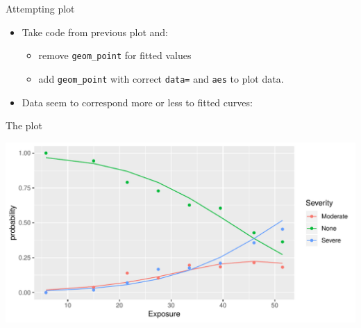 \begin{frame}[fragile]{Attempting plot}
  
  \begin{itemize}
  \item Take code from previous plot and:
    \begin{itemize}
    \item remove \texttt{geom\_point} for fitted values
    \item add \texttt{geom\_point} with correct \texttt{data=} and
      \texttt{aes} to plot data.
    \end{itemize}
    
\begin{knitrout}
\color{fgcolor}\begin{kframe}
\begin{alltt}
\hlkwb{=}\hlstd{(}
  \hlopt{+}
  \hlstd{(}\hlstd{(}\hlopt{+}
  \hlstd{(}\hlstd{(}
\end{alltt}
\end{kframe}
\end{knitrout}

\item Data seem to correspond more or less to fitted curves:
  \end{itemize}
  
\end{frame}

\begin{frame}[fragile]{The plot}
  
\begin{knitrout}
\color{fgcolor}\begin{kframe}
\begin{alltt}
\end{alltt}
\end{kframe}
\includegraphics[width=\maxwidth]{figure/unnamed-chunk-45-1} 

\end{knitrout}
\end{frame}

